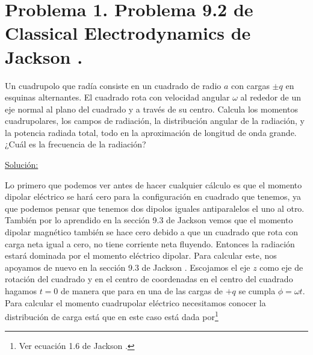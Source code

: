 \documentclass[a4paper,11pt]{article}
\numberwithin{equation}{section}
\renewcommand{\thefootnote}{\fnsymbol{footnote}}
\begin{document}

\fancyhead[R]{\thepage}

\setcounter{footnote}{0}
\renewcommand*{\thefootnote}{\arabic{footnote}}


\section{Problema 1. Problema 9.2 de Classical Electrodynamics
de Jackson \cite{jackson}.}

Un cuadrupolo que radía consiste en un cuadrado de radio $a$ con cargas $\pm q$ en 
esquinas alternantes. El cuadrado rota con velocidad angular $\omega$ al rededor 
de un eje normal al plano del cuadrado y a través de su centro. Calcula los 
momentos cuadrupolares, los campos de radiación, la distribución angular de 
la radiación, y la potencia radiada total, todo en la aproximación de 
longitud de onda grande. ¿Cuál es la frecuencia de la radiación?

\vspace{.3cm}

\underline{Solución:} \vspace{.3cm}

Lo primero que podemos ver antes de hacer cualquier cálculo es que el momento 
dipolar eléctrico se hará cero para la configuración en cuadrado que tenemos, ya que 
podemos pensar que tenemos dos dipolos iguales antiparalelos el uno al otro. También 
por lo aprendido en la sección 9.3 de Jackson \cite{jackson} vemos que 
el momento dipolar magnético también se hace cero debido a que un cuadrado que 
rota con carga neta igual a cero, no tiene corriente neta fluyendo. Entonces la 
radiación estará dominada por el momento eléctrico dipolar. Para calcular este, 
nos apoyamos de nuevo en la sección 9.3 de Jackson \cite{jackson}. Escojamos el 
eje $z$ como eje de rotación del cuadrado y en el centro de coordenadas en el centro 
del cuadrado hagamos $t=0$ de manera que para en una de las cargas de $+q$ se 
cumpla $\phi = \omega t$. Para calcular el momento cuadrupolar eléctrico necesitamos 
conocer la distribución de carga está que en este caso está dada
por\footnote{Ver ecuación 1.6 de Jackson \cite{jackson}.} 
\end{document}
